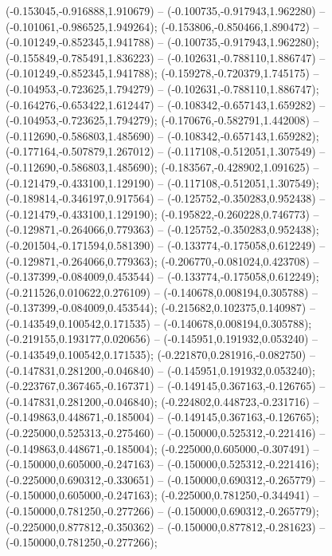  (-0.153045,-0.916888,1.910679) -- (-0.100735,-0.917943,1.962280) -- (-0.101061,-0.986525,1.949264);
 (-0.153806,-0.850466,1.890472) -- (-0.101249,-0.852345,1.941788) -- (-0.100735,-0.917943,1.962280);
 (-0.155849,-0.785491,1.836223) -- (-0.102631,-0.788110,1.886747) -- (-0.101249,-0.852345,1.941788);
 (-0.159278,-0.720379,1.745175) -- (-0.104953,-0.723625,1.794279) -- (-0.102631,-0.788110,1.886747);
 (-0.164276,-0.653422,1.612447) -- (-0.108342,-0.657143,1.659282) -- (-0.104953,-0.723625,1.794279);
 (-0.170676,-0.582791,1.442008) -- (-0.112690,-0.586803,1.485690) -- (-0.108342,-0.657143,1.659282);
 (-0.177164,-0.507879,1.267012) -- (-0.117108,-0.512051,1.307549) -- (-0.112690,-0.586803,1.485690);
 (-0.183567,-0.428902,1.091625) -- (-0.121479,-0.433100,1.129190) -- (-0.117108,-0.512051,1.307549);
 (-0.189814,-0.346197,0.917564) -- (-0.125752,-0.350283,0.952438) -- (-0.121479,-0.433100,1.129190);
 (-0.195822,-0.260228,0.746773) -- (-0.129871,-0.264066,0.779363) -- (-0.125752,-0.350283,0.952438);
 (-0.201504,-0.171594,0.581390) -- (-0.133774,-0.175058,0.612249) -- (-0.129871,-0.264066,0.779363);
 (-0.206770,-0.081024,0.423708) -- (-0.137399,-0.084009,0.453544) -- (-0.133774,-0.175058,0.612249);
 (-0.211526,0.010622,0.276109) -- (-0.140678,0.008194,0.305788) -- (-0.137399,-0.084009,0.453544);
 (-0.215682,0.102375,0.140987) -- (-0.143549,0.100542,0.171535) -- (-0.140678,0.008194,0.305788);
 (-0.219155,0.193177,0.020656) -- (-0.145951,0.191932,0.053240) -- (-0.143549,0.100542,0.171535);
 (-0.221870,0.281916,-0.082750) -- (-0.147831,0.281200,-0.046840) -- (-0.145951,0.191932,0.053240);
 (-0.223767,0.367465,-0.167371) -- (-0.149145,0.367163,-0.126765) -- (-0.147831,0.281200,-0.046840);
 (-0.224802,0.448723,-0.231716) -- (-0.149863,0.448671,-0.185004) -- (-0.149145,0.367163,-0.126765);
 (-0.225000,0.525313,-0.275460) -- (-0.150000,0.525312,-0.221416) -- (-0.149863,0.448671,-0.185004);
 (-0.225000,0.605000,-0.307491) -- (-0.150000,0.605000,-0.247163) -- (-0.150000,0.525312,-0.221416);
 (-0.225000,0.690312,-0.330651) -- (-0.150000,0.690312,-0.265779) -- (-0.150000,0.605000,-0.247163);
 (-0.225000,0.781250,-0.344941) -- (-0.150000,0.781250,-0.277266) -- (-0.150000,0.690312,-0.265779);
 (-0.225000,0.877812,-0.350362) -- (-0.150000,0.877812,-0.281623) -- (-0.150000,0.781250,-0.277266);
